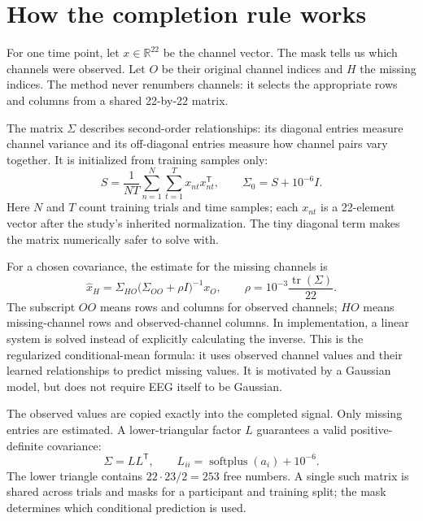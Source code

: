\documentclass[11pt,a4paper]{article}
\begin{document}
\section{How the completion rule works}
For one time point, let $x\in\mathbb R^{22}$ be the channel vector. The mask tells us which channels were observed. Let $O$ be their original channel indices and $H$ the missing indices. The method never renumbers channels: it selects the appropriate rows and columns from a shared 22-by-22 matrix.

The matrix $\Sigma$ describes second-order relationships: its diagonal entries measure channel variance and its off-diagonal entries measure how channel pairs vary together. It is initialized from training samples only:
\begin{equation}
 S=\frac{1}{NT}\sum_{n=1}^{N}\sum_{t=1}^{T}x_{nt}x_{nt}^{\mathsf T},\qquad
 \Sigma_0=S+10^{-6}I.
\end{equation}
Here $N$ and $T$ count training trials and time samples; each $x_{nt}$ is a 22-element vector after the study's inherited normalization. The tiny diagonal term makes the matrix numerically safer to solve with.

For a chosen covariance, the estimate for the missing channels is
\begin{equation}
 \widehat x_H=\Sigma_{HO}\bigl(\Sigma_{OO}+\rho I\bigr)^{-1}x_O,
 \qquad \rho=10^{-3}\frac{\operatorname{tr}(\Sigma)}{22}.
 \label{eq:conditional}
\end{equation}
The subscript $OO$ means rows and columns for observed channels; $HO$ means missing-channel rows and observed-channel columns. In implementation, a linear system is solved instead of explicitly calculating the inverse. This is the regularized conditional-mean formula: it uses observed channel values and their learned relationships to predict missing values. It is motivated by a Gaussian model, but does not require EEG itself to be Gaussian.

The observed values are copied exactly into the completed signal. Only missing entries are estimated. A lower-triangular factor $L$ guarantees a valid positive-definite covariance:
\begin{equation}
 \Sigma=LL^{\mathsf T},\qquad L_{ii}=\operatorname{softplus}(a_i)+10^{-6}.
\end{equation}
The lower triangle contains $22\cdot23/2=253$ free numbers. A single such matrix is shared across trials and masks for a participant and training split; the mask determines which conditional prediction is used.
\end{document}
